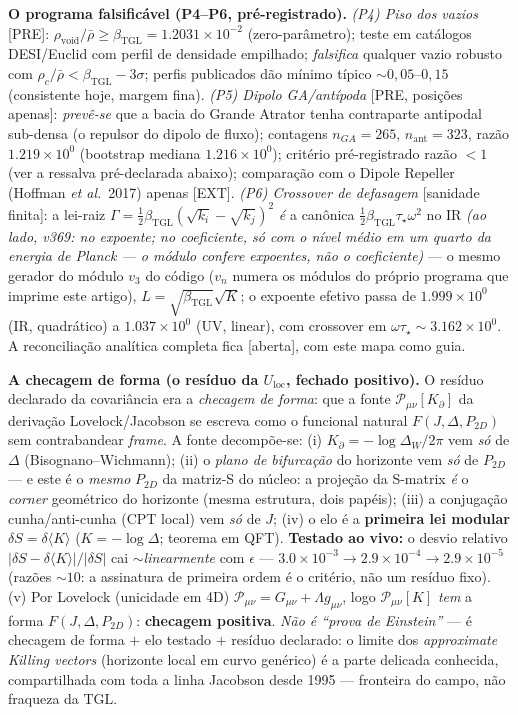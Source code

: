 \documentclass[11pt]{article}
\newcommand{\bTGL}{\beta_{\mathrm{TGL}}}\newcommand{\Msun}{M_{\odot}}\newcommand{\TGL}{\mathrm{TGL}}
\theoremstyle{definition}\newtheorem{deriv}{Derivação}
\begin{document}
\textbf{O programa falsificável (P4--P6, pré-registrado).} \emph{(P4) Piso dos vazios} [PRE]: $\rho_{\mathrm{void}}/\bar\rho\ge\bTGL=1.2031\times10^{-2}$ (zero-parâmetro); teste em catálogos DESI/Euclid com perfil de densidade empilhado; \emph{falsifica} qualquer vazio robusto com $\rho_c/\bar\rho<\bTGL-3\sigma$; perfis publicados dão mínimo típico $\sim0{,}05$--$0{,}15$ (consistente hoje, margem fina). \emph{(P5) Dipolo GA/antípoda} [PRE, posições apenas]: \emph{prevê-se} que a bacia do Grande Atrator tenha contraparte antipodal sub-densa (o repulsor do dipolo de fluxo); contagens $n_{GA}=265$, $n_{\mathrm{ant}}=323$, razão $1.219\times10^{0}$ (bootstrap mediana $1.216\times10^{0}$); critério pré-registrado razão $<1$ (ver a ressalva pré-declarada abaixo); comparação com o Dipole Repeller (Hoffman \emph{et al.}\ 2017) apenas [EXT]. \emph{(P6) Crossover de defasagem} [sanidade finita]: a lei-raiz $\Gamma=\tfrac12\bTGL(\sqrt{k_i}-\sqrt{k_j})^2$ \emph{é} a canônica $\tfrac12\bTGL\tau_\star\omega^2$ no IR \emph{(ao lado, v369: no expoente; no coeficiente, só com o nível médio em um quarto da energia de Planck --- o módulo confere expoentes, não o coeficiente)} --- o mesmo gerador do módulo $v_3$ do código ($v_n$ numera os módulos do próprio programa que imprime este artigo), $L=\sqrt{\bTGL}\sqrt{K}$; o expoente efetivo passa de $1.999\times10^{0}$ (IR, quadrático) a $1.037\times10^{0}$ (UV, linear), com crossover em $\omega\tau_\star\sim3.162\times10^{0}$. A reconciliação analítica completa fica [aberta], com este mapa como guia.

\textbf{A checagem de forma (o resíduo da $U_{\mathrm{loc}}$, fechado positivo).} O resíduo declarado da covariância era a \emph{checagem de forma}: que a fonte $\mathcal P_{\mu\nu}[K_\partial]$ da derivação Lovelock/Jacobson se escreva como o funcional natural $F(J,\Delta,P_{2D})$ sem contrabandear \emph{frame}. A fonte decompõe-se: (i) $K_\partial=-\log\Delta_W/2\pi$ vem \emph{só} de $\Delta$ (Bisognano--Wichmann); (ii) o \emph{plano de bifurcação} do horizonte vem \emph{só} de $P_{2D}$ --- e este é o \emph{mesmo} $P_{2D}$ da matriz-S do núcleo: a projeção da S-matrix \emph{é} o \emph{corner} geométrico do horizonte (mesma estrutura, dois papéis); (iii) a conjugação cunha/anti-cunha (CPT local) vem \emph{só} de $J$; (iv) o elo é a \textbf{primeira lei modular} $\delta S=\delta\langle K\rangle$ ($K=-\log\Delta$; teorema em QFT). \textbf{Testado ao vivo:} o desvio relativo $|\delta S-\delta\langle K\rangle|/|\delta S|$ cai $\sim$\emph{linearmente} com $\epsilon$ --- $3.0\times10^{-3}\to2.9\times10^{-4}\to2.9\times10^{-5}$ (razões $\sim10$: a assinatura de primeira ordem é o critério, não um resíduo fixo). (v) Por Lovelock (unicidade em 4D) $\mathcal P_{\mu\nu}=G_{\mu\nu}+\Lambda g_{\mu\nu}$, logo $\mathcal P_{\mu\nu}[K]$ \emph{tem} a forma $F(J,\Delta,P_{2D})$: \textbf{checagem positiva}. \emph{Não é ``prova de Einstein''} --- é checagem de forma $+$ elo testado $+$ resíduo declarado: o limite dos \emph{approximate Killing vectors} (horizonte local em curvo genérico) é a parte delicada conhecida, compartilhada com toda a linha Jacobson desde 1995 --- fronteira do campo, não fraqueza da $\TGL$.
\end{document}
